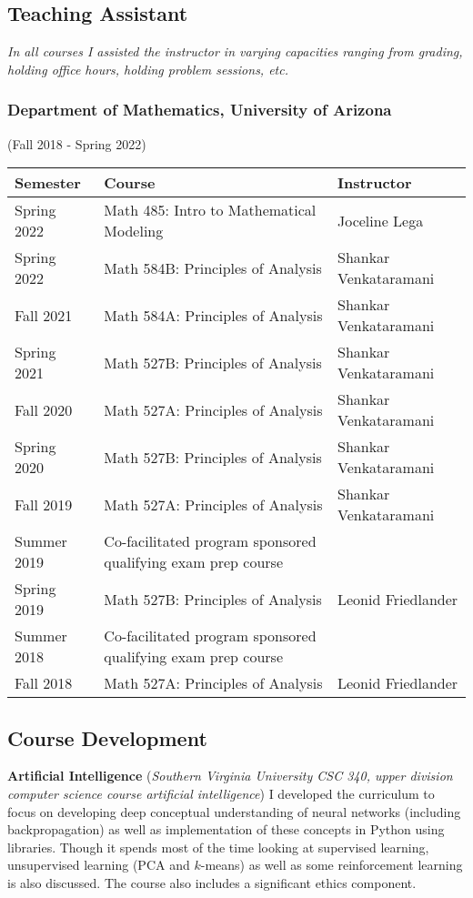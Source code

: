 \documentclass{article}
\begin{document}
\subsection*{Teaching Assistant}
\emph{In all courses I assisted the instructor in varying capacities ranging from grading, holding office hours, holding problem sessions, etc.}

\subsubsection*{Department of Mathematics, University of Arizona}
(Fall 2018 - Spring 2022)
\begin{longtable}{|>{\centering\arraybackslash}m{2cm}|>{\arraybackslash}m{6cm}|>{\arraybackslash}m{6cm}|}
\hline
\textbf{Semester} & \textbf{Course} & \textbf{Instructor} \\
\hline
\endhead
Spring 2022 & Math 485: Intro to Mathematical Modeling & Joceline Lega \\
\hline
Spring 2022 & Math 584B: Principles of Analysis & Shankar Venkataramani \\
\hline
Fall 2021 & Math 584A: Principles of Analysis & Shankar Venkataramani \\
\hline
\hline
Spring 2021 & Math 527B: Principles of Analysis & Shankar Venkataramani \\
\hline
Fall 2020 & Math 527A: Principles of Analysis & Shankar Venkataramani \\
\hline
\hline
Spring 2020 & Math 527B: Principles of Analysis & Shankar Venkataramani \\
\hline
Fall 2019 & Math 527A: Principles of Analysis & Shankar Venkataramani \\
\hline
\hline
Summer 2019 & Co-facilitated program sponsored qualifying exam prep course & \\
\hline
Spring 2019 & Math 527B: Principles of Analysis & Leonid Friedlander \\
\hline
\hline
Summer 2018 & Co-facilitated program sponsored qualifying exam prep course & \\
\hline
Fall 2018 & Math 527A: Principles of Analysis & Leonid Friedlander \\
\hline
\end{longtable}

\subsection*{Course Development}

\textbf{Artificial Intelligence} (\emph{Southern Virginia University CSC 340, upper division computer science course artificial intelligence}) I developed the curriculum to focus on developing deep conceptual understanding of neural networks (including backpropagation) as well as implementation of these concepts in Python using libraries. Though it spends most of the time looking at supervised learning, unsupervised learning (PCA and $k$-means) as well as some reinforcement learning is also discussed. The course also includes a significant ethics component.
\end{document}
